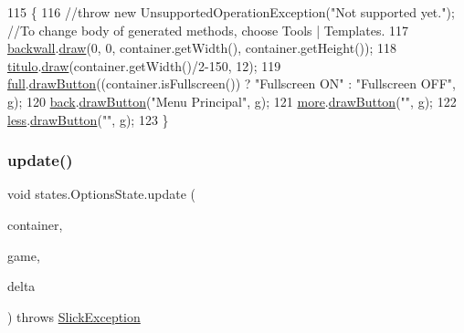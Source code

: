 \begin{DoxyCode}
115                                                                                                        \{
116         \textcolor{comment}{//throw new UnsupportedOperationException("Not supported yet."); //To change body of generated
       methods, choose Tools | Templates.}
117         \mbox{\hyperlink{classstates_1_1_options_state_a258584e2d75daa51de1788b6791cb3f7}{backwall}}.\mbox{\hyperlink{classorg_1_1newdawn_1_1slick_1_1_image_a9bddcca05c7140ab45df8ac5b250b6cd}{draw}}(0, 0, container.getWidth(), container.getHeight());
118         \mbox{\hyperlink{classstates_1_1_options_state_af4b29604629c41f9baeabdde2d2daec2}{titulo}}.\mbox{\hyperlink{classorg_1_1newdawn_1_1slick_1_1_image_a9bddcca05c7140ab45df8ac5b250b6cd}{draw}}(container.getWidth()/2-150, 12);
119         \mbox{\hyperlink{classstates_1_1_options_state_a904fabe1b3ae80f7ff9ea5a22d0dbc88}{full}}.\mbox{\hyperlink{classgui_1_1_button_a0963af10c0ebfda675428cf6692e3df5}{drawButton}}((container.isFullscreen()) ? \textcolor{stringliteral}{"Fullscreen ON"} : \textcolor{stringliteral}{"Fullscreen OFF"}, g);
120         \mbox{\hyperlink{classstates_1_1_options_state_a3126dfa1dd586fed0c1dfd6ab5176e01}{back}}.\mbox{\hyperlink{classgui_1_1_button_a0963af10c0ebfda675428cf6692e3df5}{drawButton}}(\textcolor{stringliteral}{"Menu Principal"}, g);
121         \mbox{\hyperlink{classstates_1_1_options_state_a1364460866ca32c9a1b1a53306ff76f9}{more}}.\mbox{\hyperlink{classgui_1_1_button_a0963af10c0ebfda675428cf6692e3df5}{drawButton}}(\textcolor{stringliteral}{""}, g);
122         \mbox{\hyperlink{classstates_1_1_options_state_a1f00eafc225107c0e4665632a30e0718}{less}}.\mbox{\hyperlink{classgui_1_1_button_a0963af10c0ebfda675428cf6692e3df5}{drawButton}}(\textcolor{stringliteral}{""}, g);
123     \}
\end{DoxyCode}
\mbox{\label{classstates_1_1_options_state_a9c157deaed29b7efad997acfa6999cd8}} 
\subsubsection{\texorpdfstring{update()}{update()}}
{\footnotesize\ttfamily void states.\+Options\+State.\+update (\begin{DoxyParamCaption}\item[{\mbox{\hyperlink{classorg_1_1newdawn_1_1slick_1_1_game_container}{Game\+Container}}}]{container,  }\item[{\mbox{\hyperlink{classorg_1_1newdawn_1_1slick_1_1state_1_1_state_based_game}{State\+Based\+Game}}}]{game,  }\item[{int}]{delta }\end{DoxyParamCaption}) throws \mbox{\hyperlink{classorg_1_1newdawn_1_1slick_1_1_slick_exception}{Slick\+Exception}}\hspace{0.3cm}{\ttfamily [inline]}}

